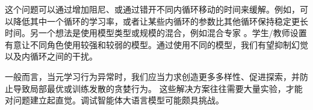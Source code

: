 这个问题可以通过增加阻尼、或通过错开不同内循环移动的时间来缓解。例如，可以降低其中一个循环的学习率，或者让某些内循环的参数比其他循环保持稳定更长时间。另一个想法是使用模型类型或规模的混合，例如混合专家 \citep{jiang2024mixtralexperts}。学生/教师设置有意让不同角色使用较强和较弱的模型。通过使用不同的模型，我们有望抑制幻觉以及内循环之间的干扰。

一般而言，当元学习行为异常时，我们应当力求创造更多多样性、促进探索，并防止导致局部最优或训练发散的贪婪行为。
这些解决方案往往需要大量实验，才能对问题建立起直觉。调试智能体大语言模型可能颇具挑战。

